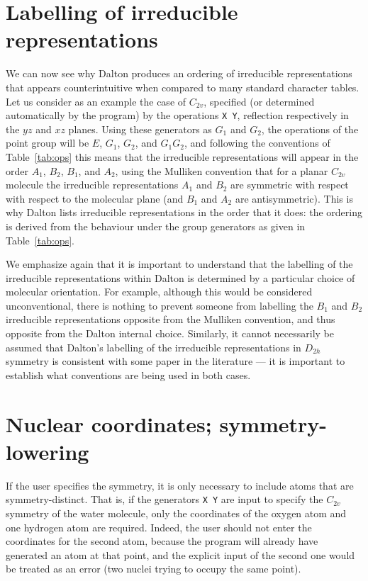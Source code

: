 \section{Labelling of irreducible representations}

We can now see why Dalton produces an ordering of irreducible
representations that appears counterintuitive when compared to many
standard character tables.  Let us consider as an example the case of
$C_{2v}$, specified (or determined automatically by the program) by
the operations \verb|X Y|, reflection respectively in the $yz$ and
$xz$ planes.  Using these generators as $G_1$ and $G_2$, the
operations of the point group will be $E$, $G_1$, $G_2$, and $G_1G_2$,
and following the conventions of Table~\ref{tab:ops} this means that
the irreducible representations will appear in the order $A_1$, $B_2$,
$B_1$, and $A_2$, using the Mulliken convention that for a planar
$C_{2v}$ molecule the irreducible representations $A_1$ and $B_2$ are
symmetric with respect with respect to the molecular plane (and $B_1$
and $A_2$ are antisymmetric).  This is why Dalton lists
irreducible representations in the order that it does: the ordering is
derived from the behaviour under the group generators as given in
Table~\ref{tab:ops}.

We emphasize again that it is important to understand that the labelling of
the irreducible representations within Dalton is determined by a
particular choice of molecular orientation.  For example, although
this would be considered unconventional, there is nothing to prevent
someone from labelling the $B_1$ and $B_2$ irreducible representations
opposite from the Mulliken convention, and thus opposite from the
Dalton internal choice.  Similarly, it cannot necessarily be assumed
that Dalton's labelling of the irreducible representations in $D_{2h}$
symmetry is consistent with some paper in the literature --- it is
important to establish what conventions are being used in both cases.

\section{Nuclear coordinates; symmetry-lowering}

If the user specifies the symmetry, it is only necessary to include
atoms that are symmetry-distinct.  That is, if the generators
\verb|X Y| are input to specify the $C_{2v}$ symmetry of the water
molecule, only the coordinates of the oxygen atom and one hydrogen
atom are required.  Indeed, the user should not enter the coordinates
for the second atom, because the program will already have generated
an atom at that point, and the explicit input of the second one would
be treated as an error (two nuclei trying to occupy the same point).

